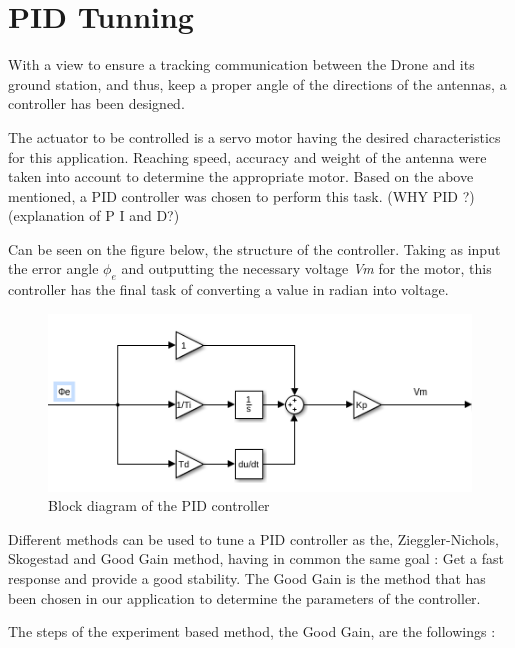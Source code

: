 \section{PID Tunning}\label{sec:PID_Tunning}

With a view to ensure a tracking communication between the Drone and its ground station, and thus, keep a proper angle of the directions of the antennas, a controller has been designed.\par

The actuator to be controlled is a servo motor having the desired characteristics for this application.  Reaching speed, accuracy and weight of the antenna were taken into account to determine the appropriate motor. Based on the above mentioned, a PID controller was chosen to perform this task. (WHY PID ?) (explanation of P I and D?)\par

Can be seen on the figure below, the structure of the controller. Taking as input the error angle \textbf{$\phi_{e}$} and outputting the necessary voltage \textit{Vm} for the motor, this controller has the final task of converting a value in radian into voltage.\par

\begin{figure}[H]
  \centering
  \includegraphics[scale=0.5]{figures/PID_2D.png}
  \caption[LABEL] {Block diagram of the PID controller}
\end{figure}
  
Different methods can be used to tune a PID controller as the, Zieggler-Nichols, Skogestad and Good Gain method, having in common the same goal : Get a fast response and provide a good stability. The Good Gain is the method that has been chosen in our application to determine the parameters of the controller.\par
  
The steps of the experiment based method, the Good Gain, are the followings :\par 
  
